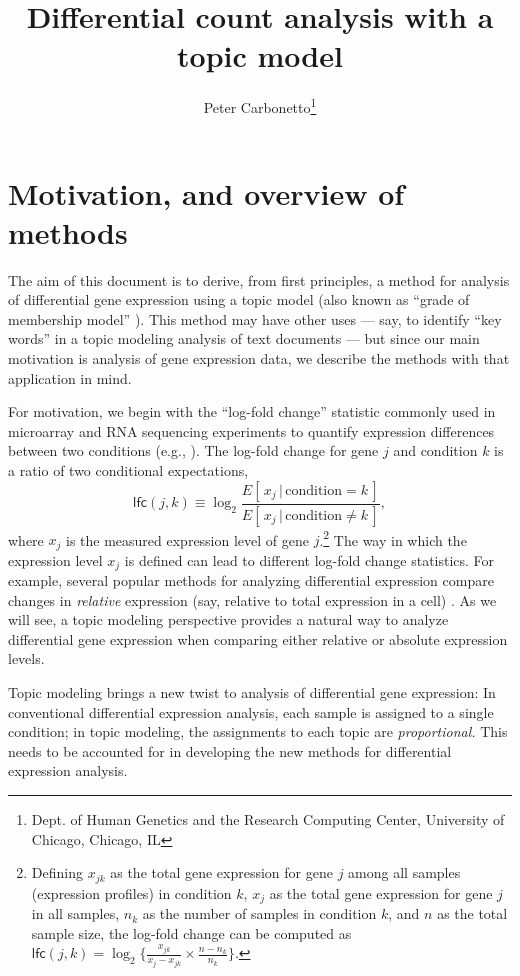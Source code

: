 \documentclass[final]{siamart171218}
\title{Differential count analysis with a topic model}
\author{Peter Carbonetto\thanks{Dept. of Human Genetics and the Research Computing Center, University of Chicago, Chicago, IL}}
\begin{document}
\maketitle

\section{Motivation, and overview of methods}

The aim of this document is to derive, from first principles, a method
for analysis of differential gene expression using a topic model (also
known as ``grade of membership model'' \cite{dey-2017}). This method
may have other uses --- say, to identify ``key words'' in a topic
modeling analysis of text documents --- but since our main motivation
is analysis of gene expression data, we describe the methods with that
application in mind.

For motivation, we begin with the ``log-fold change'' statistic
commonly used in microarray and RNA sequencing experiments to quantify
expression differences between two conditions (e.g.,
\cite{cui-churchill-2003, quackenbush-2002}). The log-fold change for
gene $j$ and condition $k$ is a ratio of two conditional expectations,
\begin{equation}
\mathsf{lfc}(j,k) \equiv
\log_2 \frac{E[\,x_j \,|\, \mathrm{condition} = k\,]}
            {E[\,x_j \,|\, \mathrm{condition} \neq k\,]},
\label{eq:lfc}
\end{equation}
where $x_j$ is the measured expression level of gene
$j$.\footnote{Defining $x_{jk}$ as the total gene expression for gene
  $j$ among all samples (expression profiles) in condition $k$, $x_j$
  as the total gene expression for gene $j$ in all samples, $n_k$ as
  the number of samples in condition $k$, and $n$ as the total sample
  size, the log-fold change can be computed as $\mathsf{lfc}(j,k) =
  \log_2 \Big\{ \frac{x_{jk}}{x_j - x_{jk}} \times \frac{n - n_k}{n_k}
  \Big\}$.} The way in which the expression level $x_j$ is defined can
lead to different log-fold change statistics. For example, several
popular methods for analyzing differential expression compare changes
in {\em relative} expression (say, relative to total expression in a
cell) \cite{bullard-2010, voom, DESeq2, edgeR}. As we will see, a
topic modeling perspective provides a natural way to analyze
differential gene expression when comparing either relative or
absolute expression levels.

Topic modeling brings a new twist to analysis of differential gene
expression: In conventional differential expression analysis, each
sample is assigned to a single condition; in topic modeling, the
assignments to each topic are {\em proportional.} This needs to be
accounted for in developing the new methods for differential
expression analysis.
\end{document}
